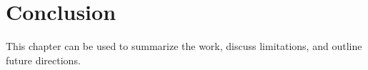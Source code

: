 \chapter{Conclusion}

This chapter can be used to summarize the work, discuss limitations, and
outline future directions.
